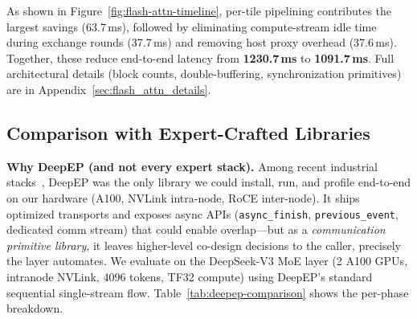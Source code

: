 As shown in Figure~\ref{fig:flash-attn-timeline}, per-tile pipelining contributes the largest savings (63.7\,ms), followed by eliminating compute-stream idle time during exchange rounds (37.7\,ms) and removing host proxy overhead (37.6\,ms). Together, these reduce end-to-end latency from \textbf{1230.7\,ms} to \textbf{1091.7\,ms}. Full architectural details (block counts, double-buffering, synchronization primitives) are in Appendix~\ref{sec:flash_attn_details}.


\vspace{-3pt}
\subsection{Comparison with Expert-Crafted Libraries}
\vspace{-3pt}
\label{sec:deepep-comparison}

\noindent\textbf{Why DeepEP (and not every expert stack).}
Among recent industrial stacks~\cite{deepep2025, chang2024flux, licker2025rdmap2p}, DeepEP was the only library we could install, run, and profile end-to-end on our hardware (A100, NVLink intra-node, RoCE inter-node). It ships optimized transports and exposes async APIs (\texttt{async\_finish}, \texttt{previous\_event}, dedicated comm stream) that could enable overlap---but as a \emph{communication primitive library}, it leaves higher-level co-design decisions to the caller, precisely the layer \cufuse{} automates. We evaluate on the DeepSeek-V3 MoE layer (2 A100 GPUs, intranode NVLink, 4096 tokens, TF32 compute) using DeepEP's standard sequential single-stream flow. Table~\ref{tab:deepep-comparison} shows the per-phase breakdown.

